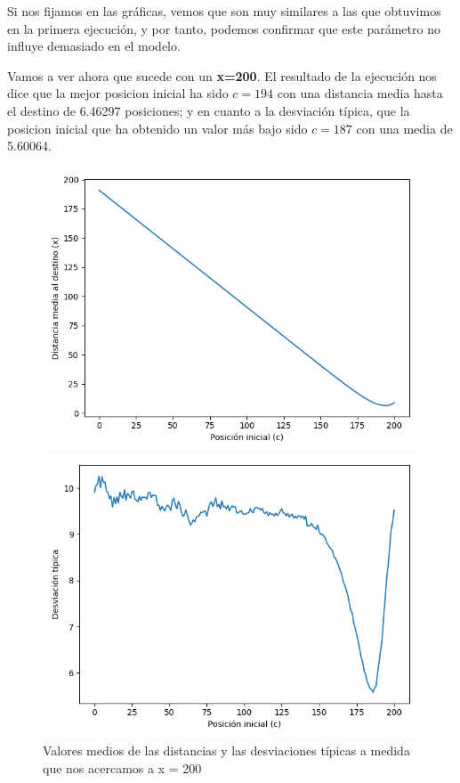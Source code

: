 \documentclass[11pt,a4paper]{report}
\begin{document}
Si nos fijamos en las gráficas, vemos que son muy similares a las que obtuvimos en la primera ejecución, y por tanto, podemos
confirmar que este parámetro no influye demasiado en el modelo.

Vamos a ver ahora que sucede con un \textbf{x=200}. El resultado de la ejecución nos dice que la mejor posicion inicial ha sido
$c=194$ con una distancia media hasta el destino de 6.46297 posiciones; y en cuanto a la desviación típica, que la posicion
inicial que ha obtenido un valor más bajo sido $c=187$ con una media de 5.60064.

\begin{figure}[H]
\centering
\begin{minipage}{0.5\textwidth}
  \centering
  \includegraphics[scale=0.4]{img/x-200-2-90.png}
\end{minipage}%
\begin{minipage}{0.5\textwidth}
  \centering
  \includegraphics[scale=0.4]{img/dt-200-2-90.png}
\end{minipage}
\caption{Valores medios de las distancias y las desviaciones típicas a medida que nos acercamos a x = 200}
\end{figure}
\end{document}
